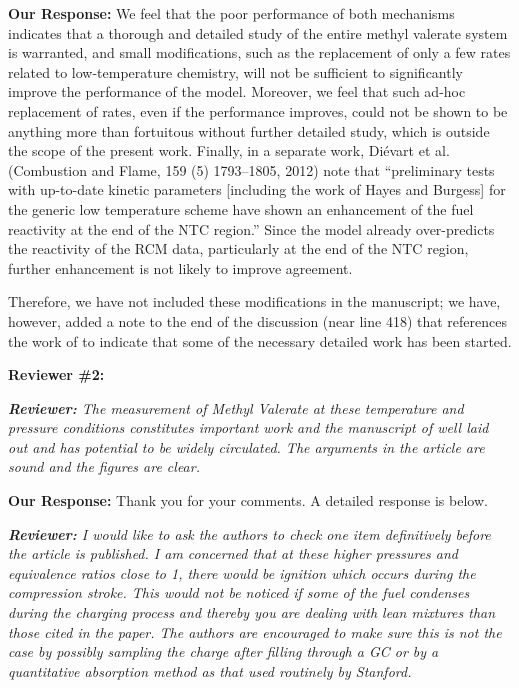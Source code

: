 \documentclass{article}
\newenvironment{reviewer}{\vspace{0.5\baselineskip}\begingroup\itshape\textbf{Reviewer:}}{\endgroup\vspace{0.5\baselineskip}}
\newenvironment{response}{\vspace{0.5\baselineskip}\textbf{Our Response:}}{\vspace{0.5\baselineskip}}
\begin{document}
\begin{response}
    We feel that the poor performance of both mechanisms indicates that a thorough and detailed
    study of the entire methyl valerate system is warranted, and small modifications, such as the
    replacement of only a few rates related to low-temperature chemistry, will not be sufficient to
    significantly improve the performance of the model. Moreover, we feel that such ad-hoc
    replacement of rates, even if the performance improves, could not be shown to be anything more
    than fortuitous without further detailed study, which is outside the scope of the present work.
    Finally, in a separate work, Di\'{e}vart et al. (Combustion and Flame, 159 (5) 1793--1805, 2012)
    note that ``preliminary tests with up-to-date kinetic parameters [including the work of Hayes
    and Burgess] for the generic low temperature scheme have shown an enhancement of the fuel
    reactivity at the end of the NTC region.'' Since the model already over-predicts the reactivity
    of the RCM data, particularly at the end of the NTC region, further enhancement is not likely to
    improve agreement.

    Therefore, we have not included these modifications in the manuscript; we have, however, added a
    note to the end of the discussion (near line 418) that references the work of \citet{Hayes2009}
    to indicate that some of the necessary detailed work has been started.
\end{response}

\noindent \textbf{Reviewer \#2:}

\begin{reviewer}
    The measurement of Methyl Valerate at these temperature and pressure conditions constitutes
    important work and the manuscript of well laid out and has potential to be widely circulated.
    The arguments in the article are sound and the figures are clear.
\end{reviewer}

\begin{response}
    Thank you for your comments. A detailed response is below.
\end{response}

\begin{reviewer}
    I would like to ask the authors to check one item definitively before the article is published.
    I am concerned that at these higher pressures and equivalence ratios close to 1, there would be
    ignition which occurs during the compression stroke. This would not be noticed if some of the
    fuel condenses during the charging process and thereby you are dealing with lean mixtures than
    those cited in the paper. The authors are encouraged to make sure this is not the case by
    possibly sampling the charge after filling through a GC or by a quantitative absorption method
    as that used routinely by Stanford.
\end{reviewer}
\end{document}
